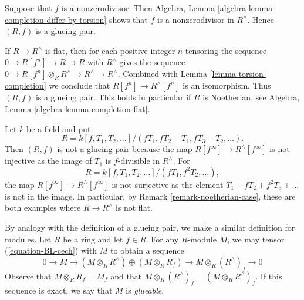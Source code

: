 \begin{remark}
\label{remark-BL-special-case}
Suppose that $f$ is a nonzerodivisor. Then
Algebra, Lemma \ref{algebra-lemma-completion-differ-by-torsion}
shows that $f$ is a nonzerodivisor in $R^\wedge$.
Hence $(R,f)$ is a glueing pair.
\end{remark}

\begin{remark}
\label{remark-noetherian-case}
If $R \to R^\wedge$ is flat, then for each positive integer $n$ tensoring
the sequence $0 \to R[f^n] \to R \to R$ with $R^\wedge$ gives the sequence
$0 \to R[f^n] \otimes_R R^\wedge \to R^\wedge \to R^\wedge$.
Combined with Lemma \ref{lemma-torsion-completion}
we conclude that $R[f^n] \to R^\wedge[f^n]$ is an isomorphism.
Thus $(R, f)$ is a glueing pair. 
This holds in particular if $R$ is Noetherian, see
Algebra, Lemma \ref{algebra-lemma-completion-flat}.
\end{remark}

\begin{example}
\label{example-not-glueing-pair}
Let $k$ be a field and put
$$
R = k[f, T_1, T_2, \ldots]/(fT_1, fT_2 - T_1, fT_3 - T_2, \ldots).
$$
Then $(R,f)$ is not a glueing pair because the map
$R[f^\infty] \to R^\wedge[f^\infty]$ is not injective
as the image of $T_1$ is $f$-divisible in $R^\wedge$.
For
$$
R = k[f, T_1, T_2, \dots]/(fT_1, f^2T_2, \dots),
$$
the map $R[f^\infty] \to R^\wedge[f^\infty]$ is not surjective
as the element $T_1 + fT_2 + f^2 T_3 + \ldots$ is not in the image.
In particular, by
Remark \ref{remark-noetherian-case}, these are both examples where
$R \to R^\wedge$ is not flat.
\end{example}

\noindent
By analogy with the definition of a glueing pair, we make a similar definition 
for modules. Let $R$ be a ring and let $f \in R$. For any $R$-module $M$, we
may tensor (\ref{equation-BL-cech}) with $M$ to obtain a sequence
\begin{equation}
\label{equation-BL-cech-mod}
0 \to M \to (M \otimes_R R^\wedge) \oplus (M \otimes_R R_f) \to
M \otimes_R (R^\wedge)_f \to 0
\end{equation}
Observe that $M \otimes_R R_f = M_f$ and that
$M \otimes_R (R^\wedge)_f = (M \otimes_R R^\wedge)_f$.
If this sequence is exact, we say that $M$ is \emph{glueable}.

